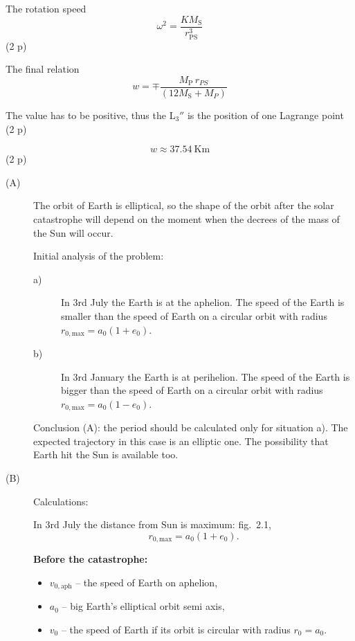 The rotation speed
\[ \omega^2 = \frac{KM_{\mathrm{S}}}{r_{\mathrm{PS}}^3} \]
\hfill(2 p)

The final relation
\[ w = \mp \frac{M_{\mathrm{P}}\, r_{PS}}{\left(12M_{\mathrm{S}} + M_{P}\right)} \]

The value has to be positive, thus the $\mathrm{L}_3''$ is the position of one
Lagrange point \hfill(2 p)

\[ w \approx 37.54\ \mathrm{Km} \]
\hfill(2 p)

\begin{description}
\item[(A)] The orbit of Earth is elliptical, so the shape of the orbit after
  the solar catastrophe will depend on the moment when the decrees %
  of the mass of the Sun will occur.

  Initial analysis of the problem:
  \begin{description}
  \item[a)] In 3rd July the Earth is at the aphelion. The speed of the Earth
    is smaller than the speed of Earth on a circular orbit with radius
    $r_{0,\mathrm{max}} = a_0(1 + e_0)$.
  \item[b)] In 3rd January the Earth is at perihelion. The speed of the Earth
    is bigger than the speed of Earth on a circular orbit with radius
    $r_{0,\mathrm{max}} = a_0(1 - e_0)$. %
  \end{description}

  Conclusion (A): the period should be calculated only for situation a). The
  expected trajectory in this case is an elliptic one. The possibility that
  Earth hit the Sun is available too.

\item[(B)] Calculations:

  In 3rd July the distance from Sun is maximum: fig.~2.1,
  \[ r_{0,\mathrm{max}} = a_0(1 + e_0). \]

  \textbf{Before the catastrophe:}
  \begin{itemize}
  \item $v_{0,\mathrm{aph}}$ -- the speed of Earth on aphelion,
  \item $a_0$ -- big Earth's elliptical orbit semi axis,
  \item $v_0$ -- the speed of Earth if its orbit is circular with radius
    $r_0 = a_0$.
  \end{itemize}


\end{description}
